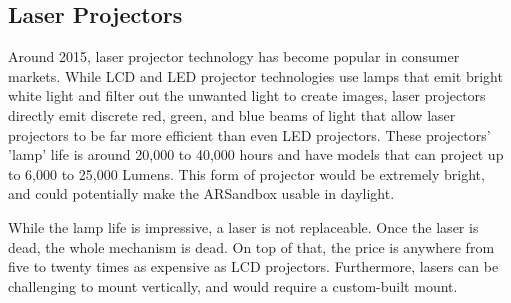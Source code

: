 \documentclass[IEEEtran]{article}
\begin{document}
\subsection{Laser Projectors}
\par Around 2015, laser projector technology has become popular in consumer markets.\cite{1} While LCD and LED projector technologies use lamps that emit bright white light and filter out the unwanted light to create images, laser projectors directly emit discrete red, green, and blue beams of light that allow laser projectors to be far more efficient than even LED projectors.\cite{4} These projectors' 'lamp' life is around 20,000 to 40,000 hours\cite{1} and have models that can project up to 6,000 to 25,000 Lumens. This form of projector would be extremely bright, and could potentially make the ARSandbox usable in daylight.   
\par While the lamp life is impressive, a laser is not replaceable. Once the laser is dead, the whole mechanism is dead.\cite{4} On top of that, the price is anywhere from five to twenty times as expensive as LCD projectors. Furthermore, lasers can be  challenging to mount vertically, and would require a custom-built mount.  
\end{document}
